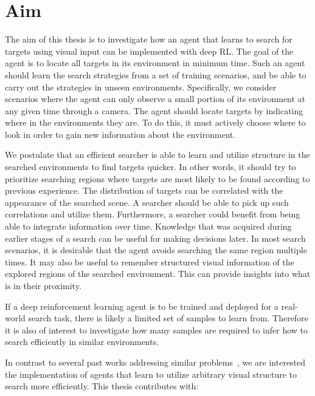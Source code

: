 \section{Aim}
\label{sec:aim}

The aim of this thesis is to investigate how an agent that learns to search for targets using visual input can be implemented with deep RL.
The goal of the agent is to locate all targets in its environment in minimum time.
Such an agent should learn the search strategies from a set of training scenarios, and be able to carry out the strategies in unseen environments.
Specifically, we consider scenarios where the agent can only observe a small portion of its environment at any given time through a camera.
The agent should locate targets by indicating where in the environments they are.
To do this, it must actively choose where to look in order to gain new information about the environment.

We postulate that an efficient searcher is able to learn and utilize structure in the searched environments to find targets quicker.
In other words, it should try to prioritize searching regions where targets are most likely to be found according to previous experience.
The distribution of targets can be correlated with the appearance of the searched scene.
A searcher should be able to pick up such correlations and utilize them.
Furthermore, a searcher could benefit from being able to integrate information over time.
Knowledge that was acquired during earlier stages of a search can be useful for making decisions later.
In most search scenarios, it is desirable that the agent avoids searching the same region multiple times.
It may also be useful to remember structured visual information of the explored regions of the searched environment.
This can provide insights into what is in their proximity.

If a deep reinforcement learning agent is to be trained and deployed for a real-world search task, there is likely a limited set of samples to learn from.
Therefore it is also of interest to investigate how many samples are required to infer how to search efficiently in similar environments.

In contrast to several past works addressing similar problems~\cite{minut_reinforcement_2001,mirowski_learning_2017,ourselin_artificial_2016,caicedo_active_2015,shubina_visual_2010,forssen_informed_2008},
we are interested the implementation of agents that learn to utilize arbitrary visual structure to search more efficiently.
This thesis contributes with:

